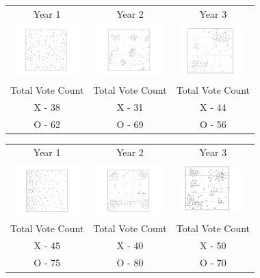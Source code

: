 \begin{tabular}{c c c }

Year 1 & Year 2 & Year 3 \\
 \includegraphics[width=1in]{assets/Gerrymandering/Gerry5x5-100-1.pdf} &  \includegraphics[width=1in]{assets/Gerrymandering/Gerry5x5-100-2.pdf} &  \includegraphics[width=1in]{assets/Gerrymandering/Gerry5x5-100-3.pdf}\\
 Total Vote Count &  Total Vote Count &  Total Vote Count\\
 X -  38& X - 31 & X  - 44\\
 O - 62 & O - 69 & O - 56
 \end{tabular}
\begin{tabular}{c c c }

Year 1 & Year 2 & Year 3 \\
 \includegraphics[width=1in]{assets/Gerrymandering/Gerry5x5-120-1.pdf} &  \includegraphics[width=1in]{assets/Gerrymandering/Gerry5x5-120-2.pdf} &  \includegraphics[width=1in]{assets/Gerrymandering/Gerry5x5-120-3.pdf}\\
 Total Vote Count &  Total Vote Count &  Total Vote Count\\
 X -  45& X - 40 & X  - 50\\
 O - 75 & O - 80 & O - 70
 \end{tabular}

